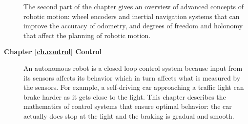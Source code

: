 \begin{description}
The second part of the chapter gives an overview of advanced concepts of robotic motion: wheel encoders and inertial navigation systems that can improve the accuracy of odometry, and degrees of freedom and holonomy that affect the planning of robotic motion.
\smallskip
\item [\textbf{Chapter \ref{ch.control} Control}] An autonomous robot is a closed loop control system because input from its sensors affects its behavior which in turn affects what is measured by the sensors. For example, a self-driving car approaching a traffic light can brake harder as it gets close to the light. This chapter describes the mathematics of control systems that ensure optimal behavior: the car actually does stop at the light and the braking is gradual and smooth.
\end{description}

